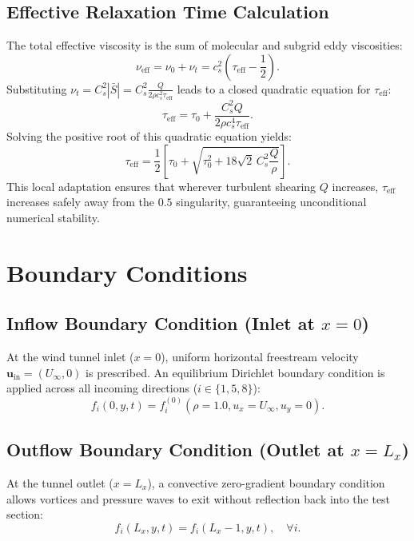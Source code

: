 \documentclass[11pt,a4paper]{article}
\begin{document}
\subsection{Effective Relaxation Time Calculation}
The total effective viscosity is the sum of molecular and subgrid eddy viscosities:
\begin{equation}
\nu_{\text{eff}} = \nu_0 + \nu_t = c_s^2 \left(\tau_{\text{eff}} - \frac{1}{2}\right).
\end{equation}
Substituting $\nu_t = C_s^2 |\bar{S}| = C_s^2 \frac{Q}{2 \rho c_s^2 \tau_{\text{eff}}}$ leads to a closed quadratic equation for $\tau_{\text{eff}}$:
\begin{equation}
\tau_{\text{eff}} = \tau_0 + \frac{C_s^2 Q}{2 \rho c_s^4 \tau_{\text{eff}}}.
\end{equation}
Solving the positive root of this quadratic equation yields:
\begin{equation}
\tau_{\text{eff}} = \frac{1}{2} \left[ \tau_0 + \sqrt{\tau_0^2 + 18 \sqrt{2} \, C_s^2 \frac{Q}{\rho}} \right].
\end{equation}
This local adaptation ensures that wherever turbulent shearing $Q$ increases, $\tau_{\text{eff}}$ increases safely away from the $0.5$ singularity, guaranteeing unconditional numerical stability.

\section{Boundary Conditions}

\subsection{Inflow Boundary Condition (Inlet at $x=0$)}
At the wind tunnel inlet ($x = 0$), uniform horizontal freestream velocity $\mathbf{u}_{\text{in}} = (U_\infty, 0)$ is prescribed. An equilibrium Dirichlet boundary condition is applied across all incoming directions ($i \in \{1, 5, 8\}$):
\begin{equation}
f_i(0, y, t) = f_i^{(0)}(\rho=1.0, u_x=U_\infty, u_y=0).
\end{equation}

\subsection{Outflow Boundary Condition (Outlet at $x=L_x$)}
At the tunnel outlet ($x = L_x$), a convective zero-gradient boundary condition allows vortices and pressure waves to exit without reflection back into the test section:
\begin{equation}
f_i(L_x, y, t) = f_i(L_x - 1, y, t), \quad \forall i.
\end{equation}
\end{document}
